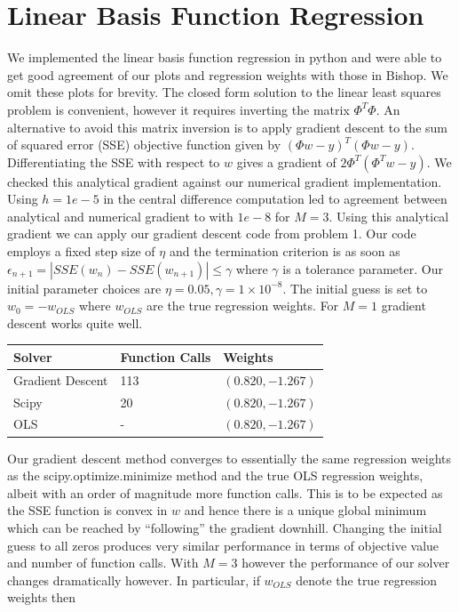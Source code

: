 \documentclass{article}
\begin{document}
\section{Linear Basis Function Regression}
We implemented the linear basis function regression in python and were able to get good agreement of our plots and regression weights with those in Bishop. We omit these plots for brevity. The closed form solution to the linear least squares problem is convenient, however it requires inverting the matrix $\Phi^T \Phi$. An alternative to avoid this matrix inversion is to apply gradient descent to the sum of squared error (SSE) objective function given by $(\Phi w - y)^T(\Phi w - y)$. Differentiating the SSE with respect to $w$ gives a gradient of $2\Phi^T(\Phi^T w - y)$. We checked this analytical gradient against our numerical gradient implementation. Using $h = 1e-5$ in the central difference computation led to agreement between analytical and numerical gradient to with $1e-8$ for $M = 3$. Using this analytical gradient we can apply our gradient descent code from problem 1. Our code employs a fixed step size of $\eta$ and the termination criterion is as soon as $\epsilon_{n+1} = |SSE(w_n) - SSE(w_{n+1})| \leq \gamma $ where $\gamma$ is a tolerance parameter. Our initial parameter choices are $\eta = 0.05, \gamma = 1 \times 10^{-8}$. The initial guess is set to $w_0 = -w_{OLS}$ where $w_{OLS}$ are the true regression weights. For $M = 1$ gradient descent works quite well.

\begin{tabular}{|l|l|l|}
\hline
Solver & Function Calls & Weights \\ \hline
Gradient Descent & 113 & $(0.820, -1.267)$ \\ \hline
Scipy & 20 & $(0.820, -1.267)$ \\ \hline
OLS  & - & $(0.820, -1.267)$ \\ \hline
\end{tabular}
%

Our gradient descent method converges to essentially the same regression weights as the scipy.optimize.minimize method and the true OLS regression weights, albeit with an order of magnitude more function calls. This is to be expected as the SSE function is convex in $w$ and hence there is a unique global minimum which can be reached by ``following'' the gradient downhill. Changing the initial guess to all zeros produces very similar performance in terms of objective value and number of function calls. With $M=3$ however the performance of our solver changes dramatically however. In particular, if $w_{OLS}$ denote the true regression weights then
\end{document}

